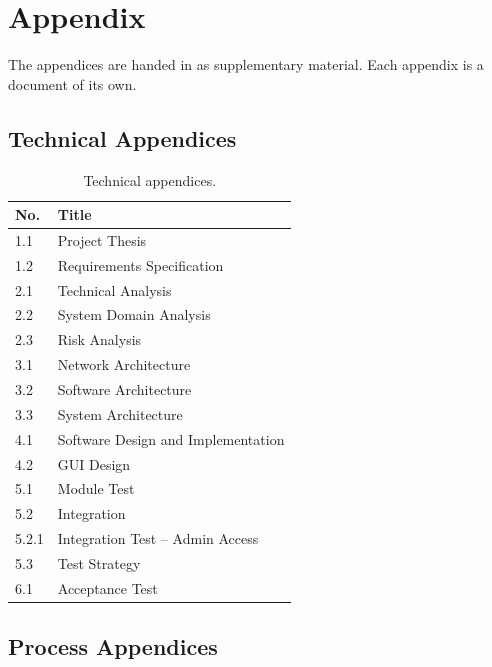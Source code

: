 \chapter{Appendix}\label{ch:appendix}

The appendices are handed in as supplementary material. Each appendix is a document of
its own.

\section{Technical Appendices}\label{sec:appendix-technical}

\begin{table}[H]
    \centering
    \begin{tabular}{@{}l l@{}}
        \hline
        No. & Title \\
        \hline
        1.1 & Project Thesis \\
        1.2 & Requirements Specification \\
        2.1 & Technical Analysis \\
        2.2 & System Domain Analysis \\
        2.3 & Risk Analysis \\
        3.1 & Network Architecture \\
        3.2 & Software Architecture \\
        3.3 & System Architecture \\
        4.1 & Software Design and Implementation \\
        4.2 & GUI Design \\
        5.1 & Module Test \\
        5.2 & Integration \\
        5.2.1 & Integration Test -- Admin Access \\
        5.3 & Test Strategy \\
        6.1 & Acceptance Test \\
        \hline
    \end{tabular}
    \caption{Technical appendices.}
    \label{tab:appendix-technical}
\end{table}

\section{Process Appendices}\label{sec:appendix-process}

